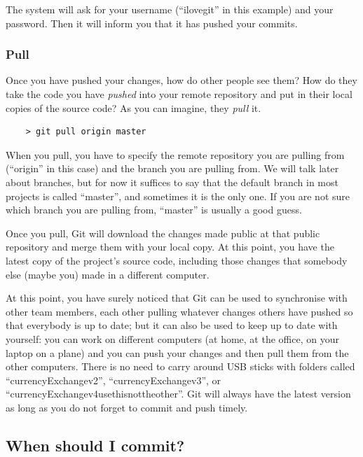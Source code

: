 The system will ask for your username (``ilovegit'' in this example)
and your password. Then it will inform you that it has pushed your
commits. 

\subsubsection{Pull}
\label{sec:pull}

Once you have pushed your changes, how do other people see them? How
do they take the code you have \emph{pushed} into your remote
repository and put in their local copies of the source code? As you
can imagine, they \emph{pull} it. 

\begin{verbatim}
    > git pull origin master
\end{verbatim}

When you pull, you have to specify the remote repository you are
pulling from (``origin'' in this case) and the branch you are pulling
from. We will talk later about branches, but for now it suffices to
say that the default branch in most projects is called ``master'', and
sometimes it is the only one. If you are not sure which branch you are
pulling from, ``master'' is usually a good guess.

Once you pull, Git will download the changes made public at that
public repository and merge them with your local copy. At this point,
you have the latest copy of the project's source code, including those
changes that somebody else (maybe you) made in a different computer. 

At this point, you have surely noticed that Git can be used to
synchronise with other team members, each other pulling whatever
changes others have pushed so that everybody is up to date; but it can
also be used to keep up to date with yourself: you can work on
different computers (at home, at the office, on your laptop on a
plane) and you can push your changes and then pull them from the other
computers. There is no need to carry around USB sticks with folders
called ``currencyExchangev2'', ``currencyExchangev3'', or
``currencyExchangev4usethisnottheother''. Git will always have the
latest version as long as you do not forget to commit and push
timely. 

\subsection{When should I commit?}
\label{sec:when-should-i}

